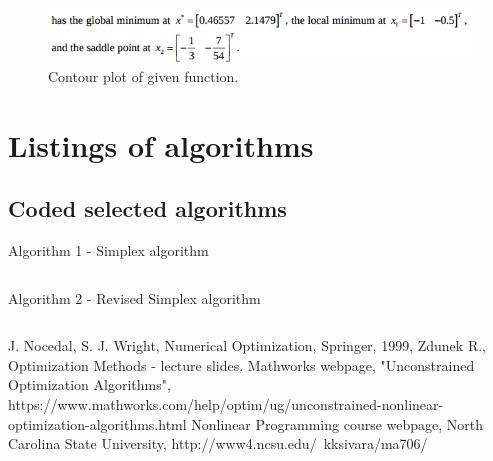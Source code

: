 \documentclass[eng,openany]{mgr}
\begin{document}
\begin{figure}[h]
\centering
\includegraphics[width=0.7\linewidth]{screenshot002}
\caption{Contour plot of given function.}
\label{fig:screenshot002}
\end{figure}
\newpage

\clearpage
\chapter{Listings of algorithms}
\section{Coded selected algorithms}
Algorithm 1 - Simplex algorithm\\ 
\begin{lstlisting}

\end{lstlisting}
\newpage
Algorithm 2 - Revised Simplex algorithm\\
\begin{lstlisting}

\end{lstlisting}
\begin{thebibliography}{8}
J. Nocedal, S. J. Wright, Numerical Optimization, Springer, 1999,
Zdunek R., Optimization Methods - lecture slides.
Mathworks webpage, "Unconstrained Optimization Algorithms", https://www.mathworks.com/help/optim/ug/unconstrained-nonlinear-optimization-algorithms.html
Nonlinear Programming course webpage, North Carolina State University,
http://www4.ncsu.edu/~kksivara/ma706/
\end{thebibliography}
\end{document}
